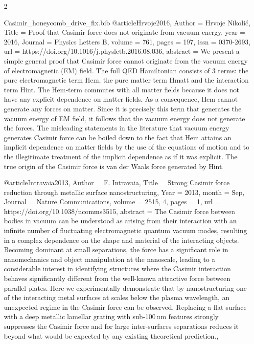 \documentclass[twoside, 10pt]{article}
\def\myfilename{Casimir_honeycomb_drive_fix}
\begin{document}
\begin{multicols}{2}
\begin{filecontents}{\myfilename.bib}
@article{Hrvoje2016,
    Author = {Hrvoje Nikolić},
    Title = {Proof that Casimir force does not originate from vacuum energy},
    year = {2016},
    Journal = {Physics Letters B},
    volume = {761},
    pages = {197},
    issn = {0370-2693},
    url = {https://doi.org/10.1016/j.physletb.2016.08.036},
    abstract = {We present a simple general proof that Casimir force cannot originate from the vacuum energy of electromagnetic (EM) field. The full QED Hamiltonian consists of 3 terms: the pure electromagnetic term Hem, the pure matter term Hmatt and the interaction term Hint. The Hem-term commutes with all matter fields because it does not have any explicit dependence on matter fields. As a consequence, Hem cannot generate any forces on matter. Since it is precisely this term that generates the vacuum energy of EM field, it follows that the vacuum energy does not generate the forces. The misleading statements in the literature that vacuum energy generates Casimir force can be boiled down to the fact that Hem attains an implicit dependence on matter fields by the use of the equations of motion and to the illegitimate treatment of the implicit dependence as if it was explicit. The true origin of the Casimir force is van der Waals force generated by Hint.}
}




@article{Intravaia2013,
    Author = {F. Intravaia},
    Title = {Strong Casimir force reduction through metallic surface nanostructuring},
    Year = {2013},
    month = {Sep},
    Journal = {Nature Communications},
    volume = {2515, 4},
    pages = {1},
    url = {https://doi.org/10.1038/ncomms3515},
    abstract = {The Casimir force between bodies in vacuum can be understood as arising from their interaction with an infinite number of fluctuating electromagnetic quantum vacuum modes, resulting in a complex dependence on the shape and material of the interacting objects. Becoming dominant at small separations, the force has a significant role in nanomechanics and object manipulation at the nanoscale, leading to a considerable interest in identifying structures where the Casimir interaction behaves significantly different from the well-known attractive force between parallel plates. Here we experimentally demonstrate that by nanostructuring one of the interacting metal surfaces at scales below the plasma wavelength, an unexpected regime in the Casimir force can be observed. Replacing a flat surface with a deep metallic lamellar grating with sub-100 nm features strongly suppresses the Casimir force and for large inter-surfaces separations reduces it beyond what would be expected by any existing theoretical prediction.},
}


\end{filecontents}
\end{multicols}
\end{document}
